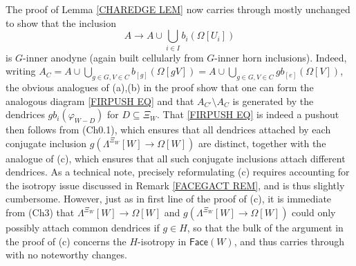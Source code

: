 \documentclass[a4paper,10pt
,draft
]{article}%
\begin{document}
\begin{remark}
The proof of Lemma \ref{CHAREDGE LEM} now carries through mostly unchanged to show that the inclusion
\begin{equation}
	A \to A \cup \bigcup_{i \in I} b_i(\Omega[U_i])
\end{equation}
is $G$-inner anodyne (again built cellularly from $G$-inner horn inclusions).
Indeed, writing 
$A_C = A \cup \bigcup_{g\in G,V \in C} b_{[g]}(\Omega[gV]) = 
A \cup \bigcup_{g\in G,V \in C} g b_{[e]}(\Omega[V])$,
the obvious analogues of (a),(b) in the proof
show that one can form the analogous diagram \eqref{FIRPUSH EQ} and that
$A_{C'} \setminus A_{C}$ is generated by the dendrices
$g b_i(\varphi_{W-D})$ for $D \subseteq \Xi_W$. 
That \eqref{FIRPUSH EQ} is indeed a pushout then follows from (Ch0.1), which ensures that all dendrices attached by each conjugate inclusion
$g\left(\Lambda^{\Xi_W}[W] \to \Omega[W]\right)$
are distinct, together with the analogue of (c), 
which ensures that all such conjugate inclusions
attach different dendrices.
As a technical note, precisely reformulating (c) requires accounting for the isotropy issue discussed in Remark \ref{FACEGACT REM}, and is thus slightly cumbersome. However, just as in first line of the proof of (c), it is immediate from (Ch3) that
$\Lambda^{\Xi_W}[W] \to \Omega[W]$
and $g\left(\Lambda^{\Xi_W}[W] \to \Omega[W]\right)$
could only possibly attach common dendrices if $g\in H$, so that the bulk of the argument in the proof of (c) concerns the $H$-isotropy in $\mathsf{Face}(W)$, 
and thus carries through with no noteworthy changes.
\end{remark}
\end{document}
